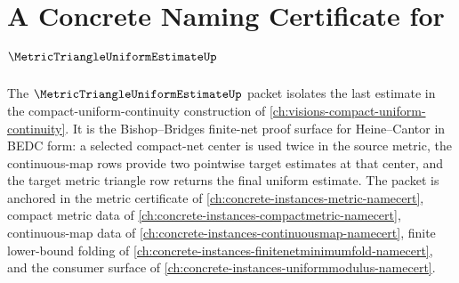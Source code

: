 \chapter{A Concrete Naming Certificate for $\MetricTriangleUniformEstimateUp$}
\label{ch:concrete-instances-metric-triangle-uniform-estimate-namecert}

The $\MetricTriangleUniformEstimateUp$ packet isolates the last estimate in the compact-uniform-continuity construction of \autoref{ch:visions-compact-uniform-continuity}. It is the Bishop--Bridges finite-net proof surface for Heine--Cantor in BEDC form: a selected compact-net center is used twice in the source metric, the continuous-map rows provide two pointwise target estimates at that center, and the target metric triangle row returns the final uniform estimate. The packet is anchored in the metric certificate of \autoref{ch:concrete-instances-metric-namecert}, compact metric data of \autoref{ch:concrete-instances-compactmetric-namecert}, continuous-map data of \autoref{ch:concrete-instances-continuousmap-namecert}, finite lower-bound folding of \autoref{ch:concrete-instances-finitenetminimumfold-namecert}, and the consumer surface of \autoref{ch:concrete-instances-uniformmodulus-namecert}.


